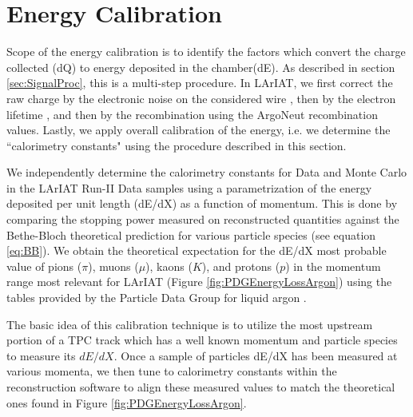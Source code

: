 \section{Energy Calibration}\label{ch:energyCalibration}
Scope of the energy calibration is to identify the factors which convert the charge collected (dQ) to energy deposited in the chamber(dE). As described in section \ref{sec:SignalProc}, this is a multi-step procedure. In LArIAT, we first correct the raw charge by the electronic noise on the considered wire \cite{technote}, then by the electron lifetime \cite{LArIATLifeTime},  and then by the recombination using the ArgoNeut recombination values. Lastly, we apply overall calibration of the energy, i.e. we determine the ``calorimetry constants" using the procedure described in this section.


We independently determine  the calorimetry constants for Data and Monte Carlo in the LArIAT Run-II Data samples using  a parametrization of the energy deposited per unit length (dE/dX) as a function of momentum. This is done by comparing the stopping power measured on reconstructed quantities against the Bethe-Bloch theoretical prediction for various particle species (see equation \ref{eq:BB}).  We obtain the theoretical expectation for the dE/dX most probable value of pions ($\pi$), muons ($\mu$), kaons ($K$), and protons ($p$) in the momentum range most relevant for LArIAT (Figure \ref{fig:PDGEnergyLossArgon}) using the tables provided by the Particle Data Group \cite{Patrignani:2016xqp} for liquid argon \cite{PDG-Argon}.

The basic idea of this calibration technique is to utilize the most upstream portion of a TPC track which has a well known momentum and particle species to measure its $dE/dX$. Once a sample of particles dE/dX has been measured at various momenta, we then tune to calorimetry constants within the reconstruction software to align these measured values to match the theoretical ones found in Figure \ref{fig:PDGEnergyLossArgon}. 

